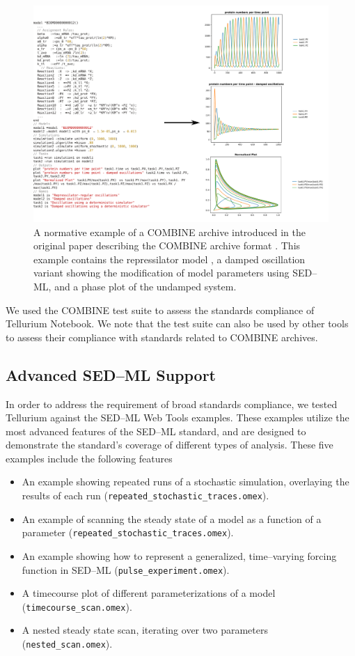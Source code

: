 \documentclass[10pt,letterpaper]{article}
\begin{document}
\begin{figure}
  \includegraphics[width=\textwidth]{fig-bergmann2014.pdf}
  \caption{ A normative example of a COMBINE archive introduced  in the original paper describing the COMBINE archive format \cite{bergmann2014combine}. This example contains the repressilator model \cite{elowitz2000synthetic}, a damped oscillation variant showing the modification of model parameters using SED--ML, and a phase plot of the undamped system. }
  \label{fig:bergmann2014}
\end{figure}

We used the COMBINE test suite to assess the standards compliance of Tellurium Notebook. We note that the test suite can also be used by other tools to assess their compliance with standards related to COMBINE archives.

\subsection*{Advanced SED--ML Support}

In order to address the requirement of broad standards compliance, we tested Tellurium against the SED--ML Web Tools examples. These examples utilize the most advanced features of the SED--ML standard, and are designed to demonstrate the standard's coverage of different types of analysis. These five examples include the following features

\begin{itemize}
\item An example showing repeated runs of a stochastic simulation, overlaying the results of each run (\texttt{repeated\_stochastic\_traces.omex}).
\item An example of scanning the steady state of a model as a function of a parameter (\texttt{repeated\_stochastic\_traces.omex}).
\item An example showing how to represent a generalized, time--varying forcing function in SED--ML (\texttt{pulse\_experiment.omex}).
\item A timecourse plot of different parameterizations of a model (\texttt{timecourse\_scan.omex}).
\item A nested steady state scan, iterating over two parameters (\texttt{nested\_scan.omex}).
\end{itemize}
\end{document}
